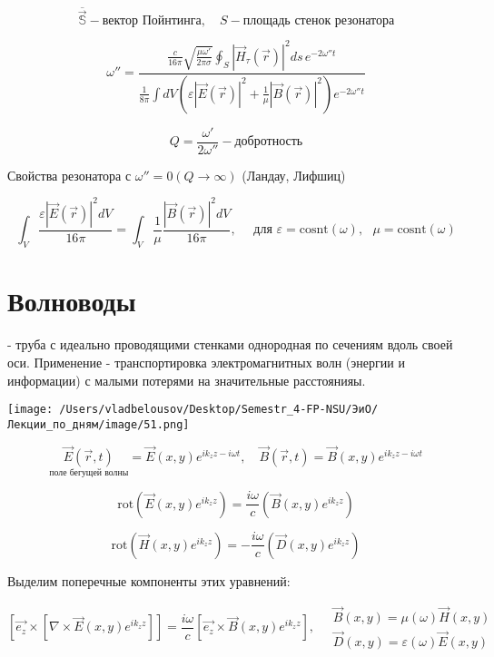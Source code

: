 \documentclass[12pt, a4paper]{report}
\begin{document}
\[  \overline{\vec{\mathbb{S}}}   - \text{вектор Пойнтинга} , \quad S - \text{площадь стенок резонатора}   \] 

\[ \omega ''  = \frac{\frac{c}{ 16 \pi } \sqrt{\frac{ \mu \omega' }{2 \pi \sigma} } \displaystyle  \oint _{S} \left\lvert \vec{H } _{\tau } (\vec{r})   \right\rvert ^2 ds \, e^{- 2 \omega '' t}}{ \frac{1}{8 \pi } \displaystyle \int dV \left(  \varepsilon \left\lvert \vec{E } (\vec{r } ) \right\rvert ^2 + \frac{1}{\mu} \left\lvert \vec{B } (\vec{r } ) \right\rvert  ^2 \right)e^{- 2 \omega '' t} }   \] 

\[ Q = \frac{ \omega ' }{2  \omega '' } - \text{добротность}   \] 

Свойства резонатора с \( \omega '' = 0 (Q \to  \infty )  \)  (Ландау, Лифшиц)

\[ \int_{V} \frac{\varepsilon \left\lvert \vec{E } (\vec{r } ) \right\rvert ^2  dV}{16 \pi} = \int_{V} \frac{1}{\mu } \frac{\left\lvert \vec{B } (\vec{r } ) \right\rvert ^2  dV}{16 \pi} ,\quad   \text{ для } \varepsilon = \mathrm{cosnt}(\omega),  \text{ } \mu = \mathrm{cosnt}(\omega)    \] 

\section{Волноводы   }

- труба с идеально проводящими стенками однородная по  сечениям вдоль своей оси. Применение - транспортировка электромагнитных волн (энергии и информации) с малыми потерями на значительные расстоянияы.

\begin{center}
    \texttt{[image: /Users/vladbelousov/Desktop/Semestr\_4-FP-NSU/ЭиО/Лекции\_по\_дням/image/51.png]}
\end{center}

\[ \underset{\text{поле бегущей волны} }{\vec{E } (\vec{r } , t )}  = \vec{E }  ( x, y ) e^{ i k_z z  - i \omega t } , \quad  \vec{B } (\vec{r }, t          )  = \vec{B }  ( x, y ) e^{ i k_z z  - i \omega t }  \] 

\[ \mathrm{rot } (\vec{E } (x,y )e^{i k_z z}) = \frac{i \omega }{c } ( \vec{B } (x,y ) e^{ i k_z z} )     \] 

\[ \mathrm{rot } (\vec{H } (x,y )e^{i k_z z}) = -\frac{i \omega }{c } ( \vec{D} (x,y ) e^{ i k_z z} )  \] 

Выделим поперечные компоненты этих уравнений: 

\[[ \vec{e_{z} } \times [ \nabla \times  \vec{E } (x,y ) e^{i k_z z} ]] = \frac{i \omega }{c } [ \vec{e_z } \times  \vec{B } (x,y) e^{ i k_z z}  ]  , \quad  \begin{aligned}
    \vec{B } (x,y ) = \mu(\omega ) \vec{H}(x,y ) \\ 
    \vec{D} (x,y ) = \varepsilon(\omega ) \vec{E}(x,y )
\end{aligned}    \] 
\end{document}
